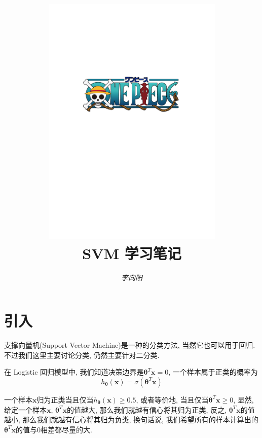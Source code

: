 \documentclass[a4paper,UTF8]{ctexart}
\theoremstyle{plain} \newtheorem{theorem}{定理}[section]
\theoremstyle{plain} \newtheorem{definition}{定义}[section]
\theoremstyle{plain} \newtheorem{lemma}{引理}[section]
\theoremstyle{plain} \newtheorem{proposition}{命题}[section]
\theoremstyle{plain} \newtheorem{example}{例}
\theoremstyle{plain} \newtheorem{remark}{注}
\theoremstyle{plain} \newtheorem{corollary}{推论}[section]
\begin{document}
\title{
\includegraphics[width=0.65\textwidth]{onepiece.pdf}\\
\vspace{2em}
\textbf{SVM 学习笔记}}
\author{\emph{李向阳} 
}
\date{}


\maketitle
\thispagestyle{empty}

\newpage


\tableofcontents

\newpage

\section{引入}
支撑向量机(Support Vector Machine)是一种的分类方法, 当然它也可以用于回归. 不过我们这里主要讨论分类, 仍然主要针对二分类.

在 Logistic 回归模型中, 我们知道决策边界是$\bm{\theta}^{T} \bm{x} = 0$, 一个样本属于正类的概率为
\begin{equation*}
h_{\bm{\theta}}(\bm{x}) = \sigma (\bm{\theta}^{T} \bm{x})
\end{equation*}

一个样本$\bm{x}$归为正类当且仅当$h_{\bm{\theta}}(\bm{x}) \geqslant 0.5$, 或者等价地, 当且仅当$\bm{\theta}^{T} \bm{x} \geqslant 0$, 显然, 给定一个样本$\bm{x}$, $\bm{\theta}^{T} \bm{x}$的值越大, 那么我们就越有信心将其归为正类, 反之, $\bm{\theta}^{T} \bm{x}$的值越小, 那么我们就越有信心将其归为负类, 换句话说, 我们希望所有的样本计算出的$\bm{\theta}^{T} \bm{x}$的值与$0$相差都尽量的大.
\end{document}
